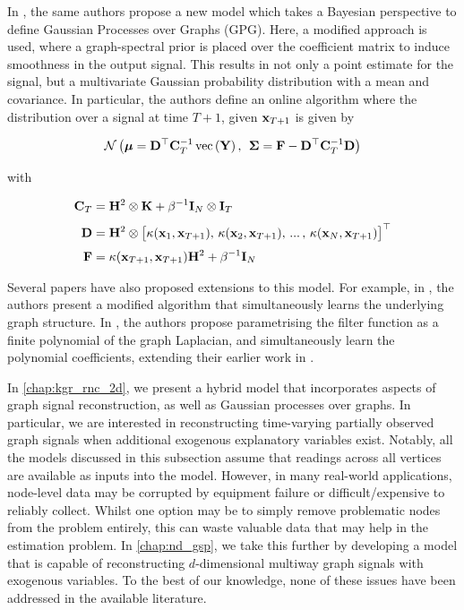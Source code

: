 In \cite{Venkitaraman2020}, the same authors propose a new model which takes a Bayesian perspective to define Gaussian Processes over Graphs (GPG). Here, a modified approach is used, where a graph-spectral prior is placed over the coefficient matrix to induce smoothness in the output signal. This results in not only a point estimate for the signal, but a multivariate Gaussian probability distribution with a mean and covariance. In particular, the authors define an online algorithm where the distribution over a signal at time $T+1$, given $\mathbf{x}_{T+1}$ is given by 

\begin{equation}
     \; \mathcal{N}\left(\boldsymbol{\mu} = \mathbf{D}^\top \mathbf{C}_T^{-1}\,\text{\textup{vec}}\left(\mathbf{Y}\right), \, \; \mathbf{\Sigma} = \mathbf{F} - \mathbf{D}^\top \mathbf{C}_T^{-1} \mathbf{D}\right) \;
\end{equation}

with

\begin{align}
    \mathbf{C}_T &= \mathbf{H}^2 \otimes \mathbf{K} + \beta^{-1} \mathbf{I}_N \otimes \mathbf{I}_T \\[0.1cm]
    \mathbf{D} &= \mathbf{H}^2 \otimes \big[\kappa(\mathbf{x}_1, \mathbf{x}_{T+1}), \, \kappa(\mathbf{x}_2, \mathbf{x}_{T+1}), \, ... \, ,\, \kappa(\mathbf{x}_N, \mathbf{x}_{T+1})\big]^\top \\[0.1cm]
    \mathbf{F} &= \kappa(\mathbf{x}_{T+1}, \mathbf{x}_{T+1}) \mathbf{H}^2 + \beta^{-1} \mathbf{I}_N
\end{align}

Several papers have also proposed extensions to this model. For example, in \cite{Miao2022}, the authors present a modified algorithm that simultaneously learns the underlying graph structure. In \cite{Zhi2023}, the authors propose parametrising the filter function as a finite polynomial of the graph Laplacian, and simultaneously learn the polynomial coefficients, extending their earlier work in \cite{Pu2021}. 

In \cref{chap:kgr_rnc_2d}, we present a hybrid model that incorporates aspects of graph signal reconstruction, as well as Gaussian processes over graphs. In particular, we are interested in reconstructing time-varying partially observed graph signals when additional exogenous explanatory variables exist. Notably, all the models discussed in this subsection assume that readings across all vertices are available as inputs into the model. However, in many real-world applications, node-level data may be corrupted by equipment failure or difficult/expensive to reliably collect. Whilst one option may be to simply remove problematic nodes from the problem entirely, this can waste valuable data that may help in the estimation problem. In \cref{chap:nd_gsp}, we take this further by developing a model that is capable of reconstructing $d$-dimensional multiway graph signals with exogenous variables. To the best of our knowledge, none of these issues have been addressed in the available literature. 


